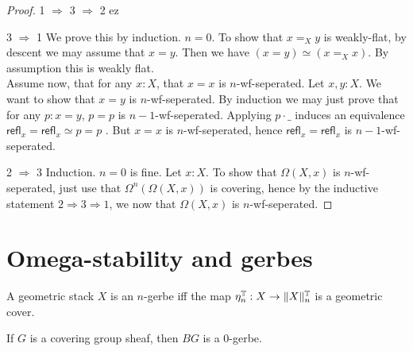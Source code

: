 \documentclass{article}
\newcommand{\refl}{\mathsf{refl}}
\begin{document}
\begin{proof}
	
	\item [1 $\Rightarrow$ 3 $\Rightarrow$ 2] ez

	\item [3 $\Rightarrow$ 1] We prove this by induction. $n = 0$. To show that $x =_{X} y$ is weakly-flat, by descent we may assume that $x = y$. Then we have $(x = y) \simeq (x =_{X} x)$. By assumption this is weakly flat. \\
	Assume now, that for any $x : X$, that $x = x$ is $n$-wf-seperated. Let $x, y : X$. We want to show that $x = y$ is $n$-wf-seperated. By induction we may just prove that for any $p : x = y$, $p = p$ is $n-1$-wf-seperated. Applying $p \cdot \_$ induces an equivalence $\refl_x = \refl_x \simeq p = p$ . But $x = x$ is $n$-wf-seperated, hence $\refl_x = \refl_x$ is $n-1$-wf-seperated.
	\item [2 $\Rightarrow$ 3] Induction. $n=0$ is fine. 
	Let $x : X$. To show that $\Omega(X,x)$ is $n$-wf-seperated, just use that $\Omega^n(\Omega(X,x))$ is covering, hence by the inductive statement $2 \Rightarrow 3 \Rightarrow 1$, we now that $\Omega(X,x)$ is $n$-wf-seperated.
\end{proof}
\section{Omega-stability and gerbes}
\begin{definition}
	A geometric stack $X$ is an $n$-gerbe iff the map $\eta_n^{\mathbb{T}} : X \to \|X\|_n^{\mathbb{T}}$ is a geometric cover.
\end{definition}
\begin{example}
	If $G$ is a covering group sheaf, then $BG$ is a 0-gerbe.
\end{example}
\end{document}
